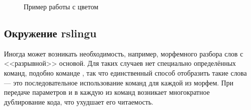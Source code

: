\begin{figure}[H]
    \centering
    \begin{minipage}[c]{0.5\textwidth}
        \begin{Latexcode}
        \end{Latexcode}
    \end{minipage}
    \hfill
    \begin{minipage}[c]{0.4\textwidth}
        \small
    \end{minipage}

    \caption{Пример работы с цветом}
\end{figure}




\subsection{Окружение rslingu}

\ExplSyntaxOn{}
\begin{tcolorbox}
\end{tcolorbox}
\ExplSyntaxOff{}

Иногда может возникать необходимость, например, морфемного разбора слов с <<разрывной>> основой. Для таких случаев нет специально
определённых команд, подобно команде , так что единственный способ отобразить такие слова --- это
последовательное использование команд для каждой из морфем. При передаче параметров  и  в каждую из
команд возникает многократное дублирование кода, что ухудшает его читаемость.

